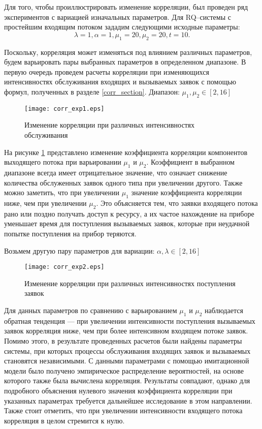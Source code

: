 Для того, чтобы проиллюстрировать изменение корреляции, был проведен ряд экспериментов с вариацией изначальных параметров.
Для RQ--системы с простейшим входящим потоком зададим следующими исходные параметры:
\begin{equation} \label{simple_summary_input_params_corr}
	\lambda = 1,
	\alpha = 1,
	\mu_{1} = 20,
	\mu_{2} = 20, 
	t = 10.
\end{equation}

Поскольку, корреляция может изменяться под влиянием различных параметров, будем варьировать пары выбранных параметров в определенном диапазоне. В первую очередь проведем расчеты корреляции при изменяющихся интенсивностях обслуживания входящих и вызываемых заявок с помощью формул, полученных в разделе \ref{corr_section}. Диапазон: $\mu_{1},\mu_{2} \in [2,16]$

\begin{figure}[H]
	\centering
	\texttt{[image: corr\_exp1.eps]}
	\caption{Изменение корреляции при различных интенсивностях обслуживания}
	\label{exps_corr_exp1}
\end{figure} 

На рисунке \ref{exps_corr_exp1} представлено изменение коэффициента корреляции компонентов выходящего потока при варьировании $\mu_{1}$ и $\mu_{2}$. Коэффициент в выбранном диапазоне всегда имеет отрицательное значение, что означает снижение количества обслуженных заявок одного типа при увеличении другого. Также можно заметить, что при увеличении $\mu_{1}$ значение коэффициента корреляции ниже, чем при увеличении $\mu_{2}$. Это объясняется тем, что заявки входящего потока рано или поздно получать доступ к ресурсу, а их частое нахождение на приборе уменьшает время для поступления вызываемых заявок, которые при неудачной попытке поступления на прибор теряются.

Возьмем другую пару параметров для вариации: $\alpha,\lambda \in [2,16]$

\begin{figure}[H]
	\centering
	\texttt{[image: corr\_exp2.eps]}
	\caption{Изменение корреляции при различных интенсивностях поступления заявок}
	\label{exps_corr_exp2}
\end{figure} 

Для данных параметров по сравнению с варьированием $\mu_{1}$ и $\mu_{2}$ наблюдается обратная тенденция --- при увеличении интенсивности поступления вызываемых заявок корреляция ниже, чем при более интенсивном входящем потоке заявок. Помимо этого, в результате проведенных расчетов были найдены параметры системы, при которых процессы обслуживания входящих заявок и вызываемых становятся независимыми. С данными параметрами с помощью имитационной модели было получено эмпирическое распределение вероятностей, на основе которого также была вычислена корреляция. Результаты совпадают, однако для подробного объяснения нулевого значения коэффициента корреляции при указанных параметрах требуется дальнейшее исследование в этом направлении.
Также стоит отметить, что при увеличении интенсивности входящего потока корреляция в целом стремится к нулю.

